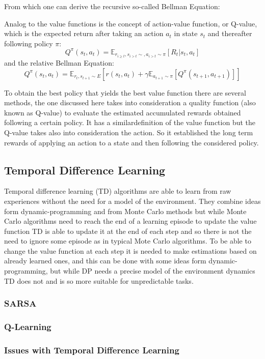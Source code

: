 From which one can derive the recursive so-called Bellman Equation:

Analog to the value functions is the concept of action-value function, or Q-value, which is the expected return after taking an action \(a_t\) in state \(s_t\) and thereafter following policy \(\pi\):
\[Q^\pi(s_t,a_t)=\mathbb{E}_{r_{i \geq t},s_{i>t} \sim ,a_{i>t} \sim \pi}[R_t|s_t,a_t]\]
and the relative Bellman Equation:
\[Q^\pi(s_t,a_t)=\mathbb{E}_{r_t,s_{t+1} \sim E }\left[ r(s_t,a_t) + \gamma \mathbb{E}_{a_{t+1} \sim \pi}\left[Q^\pi (s_{t+1},a_{t+1})\right]\right]\]

To obtain the best policy that yields the best value function there are several methods, the one discussed here takes into consideration a quality function (also known as Q-value) to evaluate the estimated accumulated rewards obtained following a certain policy. It has a similardefinition of the value function but the Q-value takes also into consideration the action. So it established the long term rewards of applying an action to a state and then following the considered policy. 

\subsection{Temporal Difference Learning}
Temporal difference learning (TD) \cite{irl} algorithms are able to learn from raw experiences without the need for a model of the environment. They combine ideas form dynamic-programming and from Monte Carlo methods but while Monte Carlo algorithms need to reach the end of a learning episode to update the value function TD is able to update it at the end of each step and so there is not the need to ignore some episode as in typical Mote Carlo algorithms.
To be able to change the value function at each step it is needed to make estimations based on already learned ones, and this can be done with some ideas form dynamic-programming, but while DP needs a precise model of the environment dynamics TD does not and is so more suitable for unpredictable tasks.
\subsubsection{SARSA}

\subsubsection{Q-Learning}
\subsubsection{Issues with Temporal Difference Learning}

